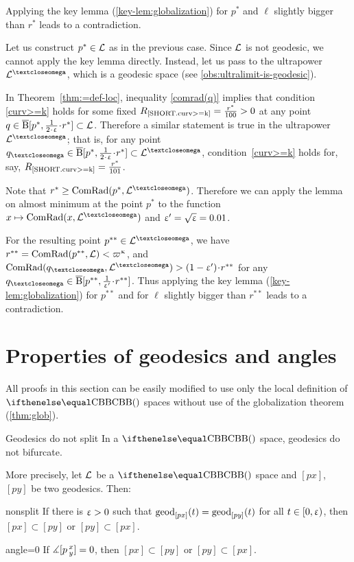 Applying the key lemma (\ref{key-lem:globalization}) for $p^*$ and  $\ell$ slightly bigger than $r^*$ leads to a contradiction.

Let us construct $p^*\in\spc{L}$ as in the previous case.
Since $\mathcal{L}$ is not geodesic, we cannot apply the key lemma directly.
Instead, let us pass to the ultrapower $\spc{L}^\o$, which
 is a geodesic space (see \ref{obs:ultralimit-is-geodesic}).

In Theorem~\ref{thm:=def-loc},
inequality \ref{comrad(q)} implies that 
condition  \ref{curv>=k} holds for some fixed $R_{\hbox{\rm\scriptsize\ref{SHORT.curv>=k}}}=\tfrac{r^*}{100}
>0$ at any point $q\in\cBall[p^*,\tfrac1{2\cdot \eps}\cdot r^*]\subset\spc{L}$.
Therefore a similar statement is true in the ultrapower $\spc{L}^\o$;
that is,
for any point
$q_\o\in\cBall[p^*,\tfrac1{2\cdot \eps}\cdot r^*]\subset\spc{L}^\o$, 
condition~\ref{curv>=k} holds for, say, $R_{\hbox{\rm\scriptsize\ref{SHORT.curv>=k}}}=\tfrac{r^*}{101}$.


Note that $r^*\ge\ComRad(p^*,\spc{L}^\o)$.
Therefore we can apply the lemma on almost minimum  
at the point $p^*$ to the function $x\z\mapsto\ComRad(x,\spc{L}^\o)$
and $\upvarepsilon'=\sqrt{\upvarepsilon}=0.01$.

For the resulting point $p^{{*}{*}}\in \spc{L}^\o$, we have $r^{{*}{*}}\z=\ComRad(p^{{*}{*}},\spc{L})\z<\varpi\kappa$, 
and 
$\ComRad(q_\o,\spc{L}^\o)\z> (1-\eps')\cdot r^{{*}{*}}$ for any $q_\o\in\cBall[p^{{*}{*}},\tfrac{1}{\eps'}\cdot r^{{*}{*}}]$. 
Thus applying the key lemma (\ref{key-lem:globalization}) for $p^{{*}{*}}$ and for $\ell$ slightly bigger than $r^{{*}{*}}$ leads to a contradiction.
\qeds



\section{Properties of geodesics and angles}\label{sec:prop.geod}

All proofs in this section can be easily modified to use only the local definition of $\Alex{}$ spaces without use of the globalization theorem (\ref{thm:glob}).
 
\begin{thm}{Geodesics do not split}\label{thm:g-split}
In a $\Alex{}$ space, geodesics do not bifurcate.

More precisely, let $\mathcal{L}$ be a $\Alex{}$ space and $[p x]$, $[p y]$ be two geodesics. Then:
\begin{subthm}{nonsplit} If  there is $\upvarepsilon>0$ such that $\mathrm{geod}_{[p x]}(t)=\mathrm{geod}_{[p y]}(t)$ 
for all $t\in[0,\eps)$, 
then $[p x]\subset [p y]$ or $[p y]\subset [p x]$.
\end{subthm}

\begin{subthm}{angle=0}
If $\measuredangle[p\,{}^{x}_{y}]=0$, then $[p x]\subset [p y]$ or $[p y]\subset [p x]$.
\end{subthm}
\end{thm}

